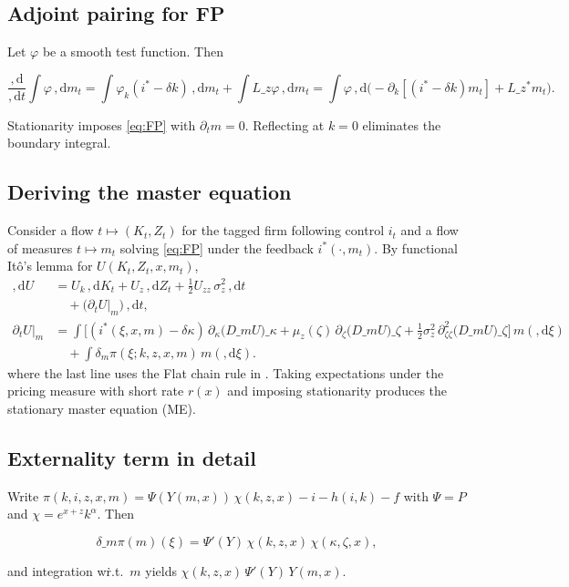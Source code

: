 \documentclass[11pt,letterpaper,oneside]{article}
\numberwithin{equation}{section}
\newcommand{\1}{\mathbf{1}}
\newcommand{\diff}{,\mathrm{d}}
\newcommand{\Lz}{L\_z}
\newcommand{\Lzadj}{L\_z^{\!*}}
\newcommand{\Dm}{D\_m}
\begin{document}
\subsection{Adjoint pairing for FP}
Let $\varphi$ be a smooth test function. Then

$$
\frac{\diff}{\diff t}\int \varphi\,\diff m_t
= \int \varphi_k (i^*-\delta k)\,\diff m_t + \int \Lz \varphi\,\diff m_t
= \int \varphi\,\diff\Big(-\partial_k[(i^*-\delta k)m_t]+\Lzadj m_t\Big).
$$

Stationarity imposes \eqref{eq:FP} with $\partial_t m=0$. Reflecting at $k=0$ eliminates the boundary integral.

\subsection{Deriving the master equation}
Consider a flow $t\mapsto (K_t,Z_t)$ for the tagged firm following control $i_t$ and a flow of measures $t\mapsto m_t$ solving \eqref{eq:FP} under the feedback $i^*(\cdot,m_t)$. By functional Itô's lemma for $U(K_t,Z_t,x,m_t)$,
\begin{align*}
\diff U &= U_k\,\diff K_t + U_z\,\diff Z_t + \tfrac12 U_{zz}\,\sigma_z^2\,\diff t \\
        &\quad + \big(\partial_t U\big|_{m}\big)\,\diff t, \\
\partial_t U\big|_{m} &= \int \Big[ (i^*(\xi,x,m)-\delta\kappa)\,\partial_{\kappa}\big(\Dm U\big)\!\_\kappa
  +\mu_z(\zeta)\,\partial_{\zeta}\big(\Dm U\big)\!\_\zeta
  +\tfrac12\sigma_z^2\,\partial_{\zeta\zeta}^2\big(\Dm U\big)\!\_\zeta\Big] \, m(\diff \xi) \\
  &\quad + \int \delta_m \pi(\xi; k,z,x,m) \, m(\diff \xi).
\end{align*}
  where the last line uses the Flat chain rule in . Taking expectations under the pricing measure with short rate $r(x)$ and imposing stationarity produces the stationary master equation (ME).

\subsection{Externality term in detail}
Write $\pi(k,i,z,x,m)=\Psi(Y(m,x))\,\chi(k,z,x)-i-h(i,k)-f$ with $\Psi=P$ and $\chi=e^{x+z}k^\alpha$. Then

$$
\delta\_m\pi(m)(\xi)=\Psi'(Y)\,\chi(k,z,x)\,\chi(\kappa,\zeta,x),
$$

and integration w\.r.t.\ $m$ yields $\chi(k,z,x)\,\Psi'(Y)\,Y(m,x)$.
\end{document}
